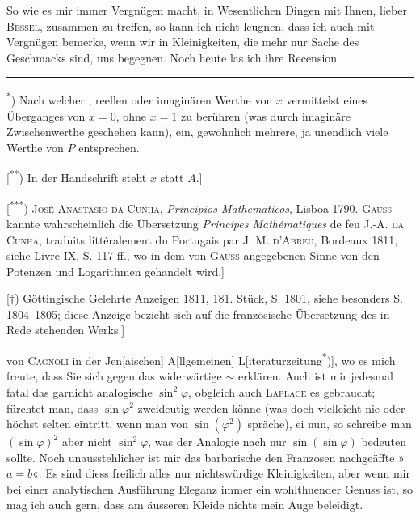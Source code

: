 \indent So wie es mir immer Vergnügen macht, in Wesentlichen Dingen mit Ihnen, lieber \textsc{Bessel}, zusammen zu treffen, so kann ich nicht leugnen, dass ich auch mit Vergnügen bemerke, wenn wir in Kleinigkeiten, die mehr nur Sache des Geschmacks sind, uns begegnen. Noch heute las ich ihre Recension
\par\medskip\noindent\rule{.24\linewidth}{.4pt}\par\smallskip
\noindent\hspace*{\parindent}\textsuperscript{*}) Nach welcher , reellen oder imaginären Werthe von $x$ vermittelst eines  Überganges von $x=0$, ohne $x=1$ zu berühren (was durch imaginäre Zwischenwerthe geschehen kann), ein, gewöhnlich mehrere, ja unendlich viele Werthe von $P$ entsprechen.
\par{\small
\noindent\hspace*{\parindent}[\textsuperscript{**}) In der Handschrift steht $x$ statt $A$.]
\par\noindent\hspace*{\parindent}[\textsuperscript{***}) \textsc{José Anastasio da Cunha}, \textit{Principios Mathematicos}, Lisboa 1790. \textsc{Gauss} kannte wahrscheinlich die Übersetzung \textit{Principes Mathématiques} de feu \textsc{J.-A. da Cunha}, traduits littéralement du Portugais par \textsc{J. M. d’Abreu}, Bordeaux 1811, siehe Livre IX, S. 117 ff., wo in dem von \textsc{Gauss} angegebenen Sinne von den Potenzen und Logarithmen gehandelt wird.]
\par\noindent\hspace*{\parindent}[$\dagger$) Göttingische Gelehrte Anzeigen 1811, 181. Stück, S. 1801, siehe besonders S. 1804--1805; diese Anzeige bezieht sich auf die französische Übersetzung des in Rede stehenden Werks.]
\par}
\clearpage{}
\noindent von \textsc{Cagnoli} in der Jen[aischen] A[llgemeinen] L[iteraturzeitung\textsuperscript{*})], wo es mich freute, dass Sie sich gegen das widerwärtige $\sim$ erklären. Auch ist mir jedesmal fatal das garnicht analogische $\sin^2\varphi$, obgleich auch \textsc{Laplace} es gebraucht; fürchtet man, dass $\sin\varphi^2$ zweideutig werden könne (was doch vielleicht nie oder höchst selten eintritt, wenn man von $\sin(\varphi^2)$ spräche), ei nun, so schreibe man $(\sin\varphi)^2$ aber nicht $\sin^2\varphi$, was der Analogie nach nur $\sin(\sin\varphi)$ bedeuten sollte. Noch unausstehlicher ist mir das barbarische den Franzosen nachgeäffte » $a=b$«. Es sind diess freilich alles nur nichtswürdige Kleinigkeiten, aber wenn mir bei einer analytischen Ausführung Eleganz immer ein wohlthuender Genuss ist, so mag ich auch gern, dass am äusseren Kleide nichts mein Auge beleidigt.
